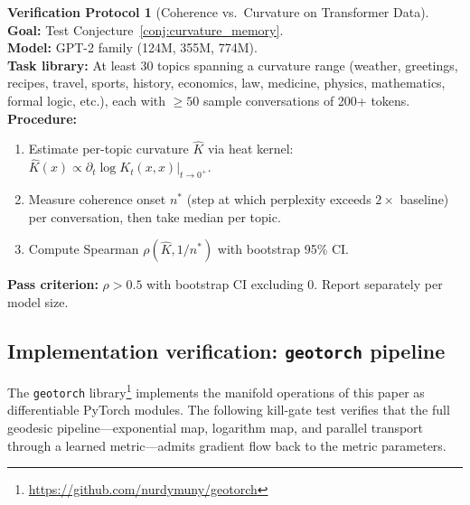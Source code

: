 \documentclass[11pt,a4paper]{article}
\theoremstyle{definition}
\newtheorem{protocol}[theorem]{Verification Protocol}
\theoremstyle{remark}
\begin{document}

\begin{protocol}[Coherence vs.\ Curvature on Transformer Data]%
\label{prot:coherence_curvature}
\textbf{Goal:} Test Conjecture~\ref{conj:curvature_memory}. \\
\textbf{Model:} GPT-2 family (124M, 355M, 774M). \\
\textbf{Task library:} At least 30 topics spanning a curvature 
range (weather, greetings, recipes, travel, sports, history, 
economics, law, medicine, physics, mathematics, formal logic, 
etc.), each with $\geq 50$ sample conversations of 200+ tokens. \\
\textbf{Procedure:}
\begin{enumerate}[nosep]
    \item Estimate per-topic curvature $\hat{K}$ via heat kernel: 
    $\hat{K}(x) \propto \partial_t \log K_t(x,x)|_{t \to 0^+}$.
    \item Measure coherence onset $n^*$ (step at which perplexity 
    exceeds $2\times$ baseline) per conversation, then take 
    median per topic.
    \item Compute Spearman $\rho(\hat{K}, 1/n^*)$ with 
    bootstrap 95\% CI.
\end{enumerate}
\textbf{Pass criterion:} $\rho > 0.5$ with bootstrap CI excluding 
$0$. Report separately per model size.
\end{protocol}

\subsection{Implementation verification: \texttt{geotorch} pipeline}%
\label{sec:geotorch_verification}

The \texttt{geotorch} library\footnote{\url{https://github.com/nurdymuny/geotorch}}
implements the manifold operations of this paper as differentiable 
PyTorch modules. The following kill-gate test verifies that the full 
geodesic pipeline---exponential map, logarithm map, and parallel 
transport through a learned metric---admits gradient flow back to 
the metric parameters.
\end{document}
